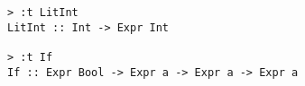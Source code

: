 \begin{repl}\begin{lstlisting}
> :t LitInt
LitInt :: Int -> Expr Int

> :t If
If :: Expr Bool -> Expr a -> Expr a -> Expr a\end{lstlisting}\end{repl}
